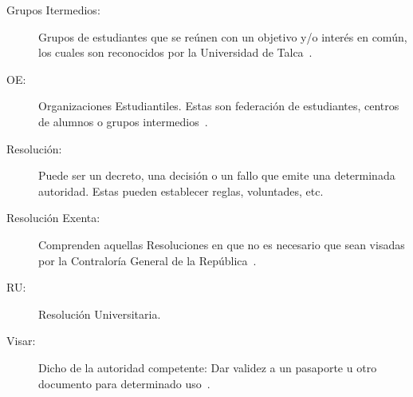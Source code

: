 \begin{glosario}
	\item 	\begin{description}
			\item[Grupos Itermedios:] Grupos de estudiantes que se reúnen con un objetivo y/o interés en común, los cuales son reconocidos por la Universidad de Talca~\cite{18}.
		\end{description}

	\item 	\begin{description}
			\item[OE:] Organizaciones Estudiantiles. Estas son federación de estudiantes, centros de alumnos o grupos intermedios~\cite{2}.
		\end{description}

	\item 	\begin{description}
			\item[Resolución:] Puede ser un decreto, una decisión o un fallo que emite una determinada autoridad. Estas pueden establecer reglas, voluntades, etc.
		\end{description}
	
	\item 	\begin{description}
			\item[Resolución Exenta:] Comprenden aquellas Resoluciones en que no es necesario que sean visadas por la Contraloría General de la República~\cite{3}.
		\end{description}
	
	\item 	\begin{description}
			\item[RU:] Resolución Universitaria.
		\end{description}

	\item 	\begin{description}
			    \item[Visar:] Dicho de la autoridad competente: Dar validez a un pasaporte u otro documento para determinado uso~\cite{4}.
			\end{description} 

\end{glosario}
